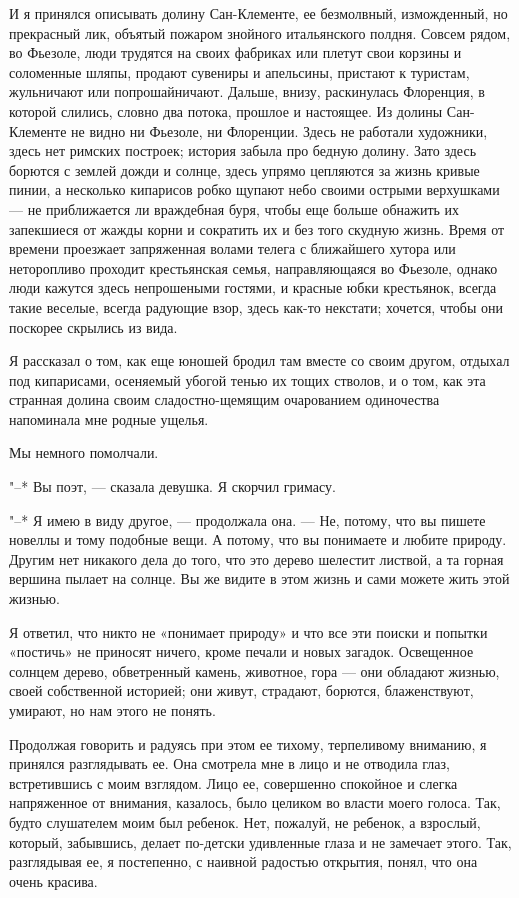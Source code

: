 И   я  принялся   описывать   долину   Сан-Клементе,  ее   безмолвный,
изможденный, но прекрасный лик,  объятый пожаром знойного итальянского
полдня.  Совсем рядом,  во Фьезоле,  люди трудятся  на своих  фабриках
или  плетут  свои  корзины  и соломенные  шляпы,  продают  сувениры  и
апельсины, пристают к туристам, жульничают или попрошайничают. Дальше,
внизу, раскинулась  Флоренция, в  которой слились, словно  два потока,
прошлое и  настоящее. Из долины  Сан-Клементе не видно ни  Фьезоле, ни
Флоренции. Здесь  не работали  художники, здесь нет  римских построек;
история  забыла  про  бедную  долину.  Зато  здесь  борются  с  землей
дожди  и солнце,  здесь  упрямо  цепляются за  жизнь  кривые пинии,  а
несколько кипарисов  робко щупают  небо своими острыми  верхушками ---
не  приближается ли  враждебная  буря, чтобы  еще  больше обнажить  их
запекшиеся от  жажды корни и  сократить их  и без того  скудную жизнь.
Время  от времени  проезжает  запряженная волами  телега с  ближайшего
хутора или неторопливо проходит  крестьянская семья, направляющаяся во
Фьезоле, однако люди кажутся здесь непрошеными гостями, и красные юбки
крестьянок, всегда  такие веселые, всегда радующие  взор, здесь как-то
некстати; хочется, чтобы они поскорее скрылись из вида.

Я рассказал о  том, как еще юношей бродил там  вместе со своим другом,
отдыхал под кипарисами,  осеняемый убогой тенью их тощих  стволов, и о
том,  как  эта  странная долина  своим  сладостно-щемящим  очарованием
одиночества напоминала мне родные ущелья.

Мы немного помолчали.

"--* Вы поэт, --- сказала девушка. Я скорчил гримасу.

"--* Я имею в виду другое, ---  продолжала она. --- Не, потому, что вы
пишете новеллы  и тому  подобные вещи.  А потому,  что вы  понимаете и
любите  природу. Другим  нет никакого  дела  до того,  что это  дерево
шелестит листвой, а та горная вершина пылает на солнце. Вы же видите в
этом жизнь и сами можете жить этой жизнью.

Я ответил,  что никто  не «понимает  природу» и что  все эти  поиски и
попытки «постичь»  не приносят ничего,  кроме печали и  новых загадок.
Освещенное солнцем дерево, обветренный  камень, животное, гора --- они
обладают  жизнью, своей  собственной  историей;  они живут,  страдают,
борются, блаженствуют, умирают, но нам этого не понять.

Продолжая говорить и радуясь при этом ее тихому, терпеливому вниманию,
я принялся  разглядывать ее.  Она смотрела  мне в  лицо и  не отводила
глаз, встретившись  с моим взглядом.  Лицо ее, совершенно  спокойное и
слегка напряженное от внимания, казалось, было целиком во власти моего
голоса.  Так, будто  слушателем  моим был  ребенок.  Нет, пожалуй,  не
ребенок, а  взрослый, который, забывшись, делает  по-детски удивленные
глаза  и не  замечает  этого.  Так, разглядывая  ее,  я постепенно,  с
наивной радостью открытия, понял, что она очень красива.

